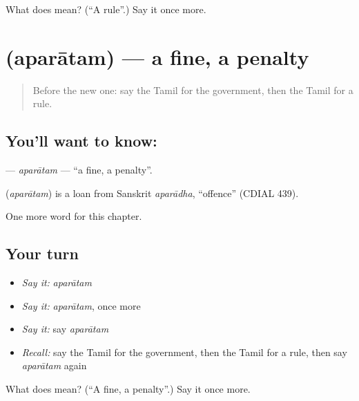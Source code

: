 \begin{tcolorbox}[breakable,colback=teal!4,colframe=teal!35!black,title={Before you move on}]
What does  mean? (\textquotedblleft{}A rule\textquotedblright{}.) Say it once more.
\end{tcolorbox}
\section[\texorpdfstring{\ta{அபராதம்} (aparātam)}{அபராதம் (aparātam)}]{ (aparātam) — a fine, a penalty}

\label{lesson:TA-C280-aparatam}



\begin{quote}
Before the new one: say the Tamil for the government, then the Tamil for a rule.
\end{quote}

\subsection*{You'll want to know: }
\textbf{} — \emph{aparātam} — \textquotedblleft{}a fine, a penalty\textquotedblright{}.

\begin{cousinweb}
\textbf{} (\emph{aparātam}) is a loan from Sanskrit \emph{aparādha}, \textquotedblleft{}offence\textquotedblright{} (CDIAL 439).
\end{cousinweb}

\begin{grammarlens}[title={What you've built}]
One more word for this chapter.
\end{grammarlens}

\subsection*{Your turn}
\begin{itemize}
\raggedright
  \item \emph{Say it:} \emph{aparātam}
  \item \emph{Say it:} \emph{aparātam}, once more
  \item \emph{Say it:} say \emph{aparātam}
  \item \emph{Recall:} say the Tamil for the government, then the Tamil for a rule, then say \emph{aparātam} again
\end{itemize}

\begin{tcolorbox}[breakable,colback=teal!4,colframe=teal!35!black,title={Before you move on}]
What does  mean? (\textquotedblleft{}A fine, a penalty\textquotedblright{}.) Say it once more.
\end{tcolorbox}
